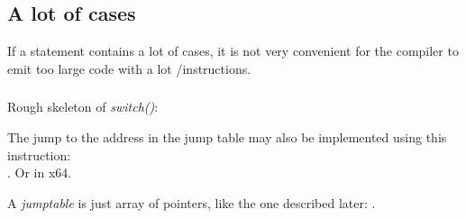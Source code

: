 \subsection{A lot of cases}

If a  statement contains a lot of cases, it is not very convenient for the compiler to emit too large code
with a lot \JE/\JNE instructions.







\subsubsection{\Conclusion{}}

Rough skeleton of \emph{switch()}:



The jump to the address in the jump table may also be implemented using this instruction: \\
.
Or  in x64.

A \emph{jumptable} is just array of pointers, like the one described later: .
